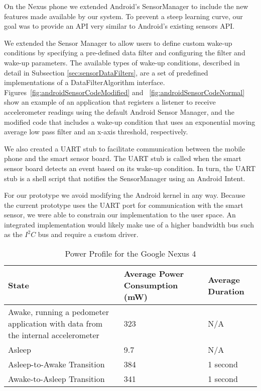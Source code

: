 On the Nexus phone we extended Android's SensorManager to include the
new features made available by our system. To prevent a steep learning
curve, our goal was to provide an API very similar to Android's
existing sensors API.  

We extended the Sensor Manager to allow users to define custom wake-up
conditions by specifying a pre-defined data filter and configuring the
filter and wake-up parameters. The available types of wake-up
conditions, described in detail in Subsection
\ref{sec:sensorDataFilters}, are a set of predefined implementations
of a DataFilterAlgorithm interface.
Figures~\ref{fig:androidSensorCodeModified} and
~\ref{fig:androidSensorCodeNormal} show an example of an application
that registers a listener to receive accelerometer readings using the
default Android Sensor Manager, and the modified code that includes a
wake-up condition that uses an exponential moving average low pass
filter and an x-axis threshold, respectively.

We also created a UART stub to facilitate communication between the
mobile phone and the smart sensor board. The UART stub is called when
the smart sensor board detects an event based on its wake-up condition.
In turn, the UART stub is a shell script that notifies the
SensorManager using an Android Intent\cite{androidintents}.

For our prototype we avoid modifying the Android kernel in any way.
Because the current prototype uses the UART port for communication
with the smart sensor, we were able to constrain our implementation to
the user space. An integrated implementation would likely make use of
a higher bandwidth bus such as the $I^2C$ bus and require a custom
driver.


\begin{table*}[t]

	\begin{tabular}{| p{7cm} | l | l |}
		\hline
		State & Average Power Consumption (mW) & Average Duration \\ \hline
		Awake, running a pedometer application with data from the internal accelerometer & 323 & N/A \\ \hline
		Asleep & 9.7 & N/A \\ \hline
		Asleep-to-Awake Transition & 384 & 1 second \\ \hline
		Awake-to-Asleep Transition & 341 & 1 second \\ \hline
	\end{tabular}
	\caption{Power Profile for the Google Nexus 4}
	\label{table:powerProfileNexus}
\end{table*}

